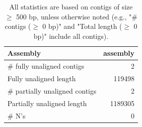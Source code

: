 \documentclass[12pt,a4paper]{article}
\begin{document}
\begin{table}[ht]
\begin{center}
\caption{All statistics are based on contigs of size $\geq$ 500 bp, unless otherwise noted (e.g., "\# contigs ($\geq$ 0 bp)" and "Total length ($\geq$ 0 bp)" include all contigs).}
\begin{tabular}{|l*{1}{|r}|}
\hline
Assembly & assembly \\ \hline
\# fully unaligned contigs & 2 \\ \hline
Fully unaligned length & 119498 \\ \hline
\# partially unaligned contigs & 2 \\ \hline
Partially unaligned length & 1189305 \\ \hline
\# N's & 0 \\ \hline
\end{tabular}
\end{center}
\end{table}
\end{document}
